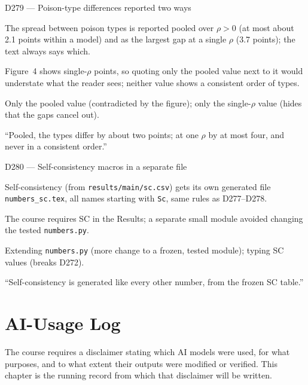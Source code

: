 \documentclass[11pt,a4paper]{report}
\begin{document}
\begin{decisionbox}{D279 --- Poison-type differences reported two ways}
\begin{description}[nosep, leftmargin=0pt]
  \item[Decision.] The spread between poison types is reported pooled over $\rho>0$ (at most about 2.1 points within a model) and as the largest gap at a single $\rho$ (3.7 points); the text always says which.
  \item[Why.] Figure~4 shows single-$\rho$ points, so quoting only the pooled value next to it would understate what the reader sees; neither value shows a consistent order of types.
  \item[Alternatives.] Only the pooled value (contradicted by the figure); only the single-$\rho$ value (hides that the gaps cancel out).
  \item[Interview line.] ``Pooled, the types differ by about two points; at one $\rho$ by at most four, and never in a consistent order.''
\end{description}
\end{decisionbox}
\begin{decisionbox}{D280 --- Self-consistency macros in a separate file}
\begin{description}[nosep, leftmargin=0pt]
  \item[Decision.] Self-consistency (from \texttt{results/main/sc.csv}) gets its own generated file \texttt{numbers\_sc.tex}, all names starting with \texttt{Sc}, same rules as D277--D278.
  \item[Why.] The course requires SC in the Results; a separate small module avoided changing the tested \texttt{numbers.py}.
  \item[Alternatives.] Extending \texttt{numbers.py} (more change to a frozen, tested module); typing SC values (breaks D272).
  \item[Interview line.] ``Self-consistency is generated like every other number, from the frozen SC table.''
\end{description}
\end{decisionbox}

\chapter{AI-Usage Log}\label{ch:ailog}
The course requires a disclaimer stating which AI models were used, for what
purposes, and to what extent their outputs were modified or verified. This
chapter is the running record from which that disclaimer will be written.
\end{document}
